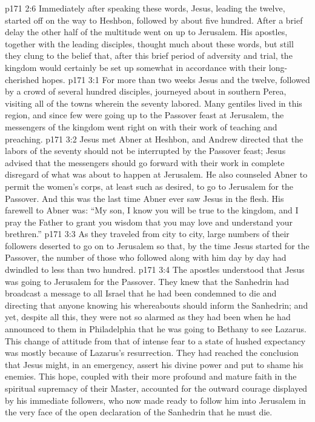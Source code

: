\vs p171 2:6 \pc Immediately after speaking these words, Jesus, leading the twelve, started off on the way to Heshbon, followed by about five hundred. After a brief delay the other half of the multitude went on up to Jerusalem. His apostles, together with the leading disciples, thought much about these words, but still they clung to the belief that, after this brief period of adversity and trial, the kingdom would certainly be set up somewhat in accordance with their long\hyp{}cherished hopes.
\vs p171 3:1 For more than two weeks Jesus and the twelve, followed by a crowd of several hundred disciples, journeyed about in southern Perea, visiting all of the towns wherein the seventy labored. Many gentiles lived in this region, and since few were going up to the Passover feast at Jerusalem, the messengers of the kingdom went right on with their work of teaching and preaching.
\vs p171 3:2 Jesus met Abner at Heshbon, and Andrew directed that the labors of the seventy should not be interrupted by the Passover feast; Jesus advised that the messengers should go forward with their work in complete disregard of what was about to happen at Jerusalem. He also counseled Abner to permit the women’s corps, at least such as desired, to go to Jerusalem for the Passover. And this was the last time Abner ever saw Jesus in the flesh. His farewell to Abner was: \textcolor{ubdarkred}{“My son, I know you will be true to the kingdom, and I pray the Father to grant you wisdom that you may love and understand your brethren.”}
\vs p171 3:3 As they traveled from city to city, large numbers of their followers deserted to go on to Jerusalem so that, by the time Jesus started for the Passover, the number of those who followed along with him day by day had dwindled to less than two hundred.
\vs p171 3:4 The apostles understood that Jesus was going to Jerusalem for the Passover. They knew that the Sanhedrin had broadcast a message to all Israel that he had been condemned to die and directing that anyone knowing his whereabouts should inform the Sanhedrin; and yet, despite all this, they were not so alarmed as they had been when he had announced to them in Philadelphia that he was going to Bethany to see Lazarus. This change of attitude from that of intense fear to a state of hushed expectancy was mostly because of Lazarus’s resurrection. They had reached the conclusion that Jesus might, in an emergency, assert his divine power and put to shame his enemies. This hope, coupled with their more profound and mature faith in the spiritual supremacy of their Master, accounted for the outward courage displayed by his immediate followers, who now made ready to follow him into Jerusalem in the very face of the open declaration of the Sanhedrin that he must die.
